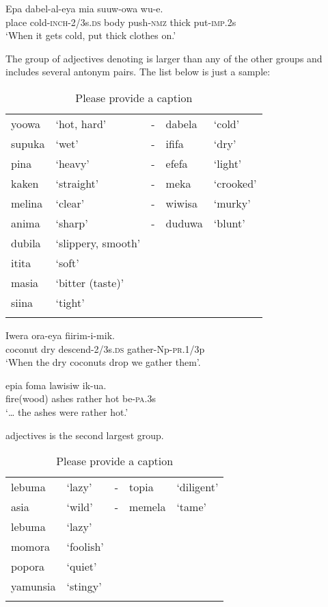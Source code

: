 \ea%
\label{ex:3:x77}
\gll Epa dabel-al-eya mia suuw-owa   wu-e. \\
place cold-\textsc{inch}-2/3s.\textsc{ds} body push-\textsc{nmz} thick put-\textsc{imp}.2s\\
\glt`When it gets cold, put thick clothes on.'
\z

The group of adjectives denoting  is larger than any of the other groups and includes several antonym pairs. The list below is just a sample:

\begin{table}
\caption{Please provide a caption}
\label{} 
\begin{tabular}{llcll}
\mytoprule
yoowa &`hot, hard' &- &dabela &`cold'\\
supuka &`wet' &- &ififa &`dry'\\
pina &`heavy' &- &efefa &`light'\\
kaken &`straight' &- &meka &`crooked'\\
melina &`clear' &- &wiwisa &`murky'\\
anima &`sharp' &- &duduwa &`blunt'\\
dubila &`slippery, smooth'&&&\\
itita &`soft'&&&\\
masia &`bitter (taste)'&&&\\
siina &`tight'&&&\\
\mybottomrule
\end{tabular}
\end{table}

\ea%
\label{ex:3:x78}
\gll Iwera  ora-eya fiirim-i-mik. \\
coconut dry descend-2/3s.\textsc{ds} gather-Np-\textsc{pr}.1/3p\\
\glt`When the dry coconuts drop we gather them'.
\z

\ea%
\label{ex:3:x1758}
\gll {\dots}epia foma lawisiw  ik-ua. \\
fire(wood) ashes rather hot be-\textsc{pa}.3s\\
\glt`{\dots} the ashes were rather hot.'
\z

 adjectives is the second largest group. 


\begin{table}
\caption{Please provide a caption}
\label{} 
\begin{tabular}{llcll}
\mytoprule
lebuma &`lazy' &- &topia &`diligent'\\
asia &`wild' &- &memela &`tame'\\
lebuma &`lazy'&&&\\
momora &`foolish'&&&\\
popora &`quiet'&&&\\
yamunsia &`stingy'&&&\\
\mybottomrule
\end{tabular}
\end{table}

